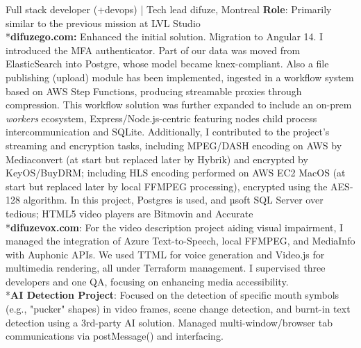 \documentclass[
  a4paper,
   maincolor=cvblue,
   sectioncolor=cvblue,
]{fortysecondscv}
\begin{document}
\newpage
\restoregeometry
{}\paperwidth

\makefrontsidebar

\vspace*{-2.9em} %
\begin{cvtable}
    {Full stack developer (+devops) | Tech lead}
    {difuze, Montreal}
    {
      \textbf{Role}: Primarily similar to the previous mission at LVL Studio\\
        \noindent\hspace*{1mm}*\textbf{difuzego.com:} Enhanced the initial solution.
        Migration to Angular 14.
        I introduced the MFA authenticator.
        Part of our data was moved from ElasticSearch into Postgre, whose model became knex-compliant.
        Also a file publishing (upload) module has been implemented,
        ingested in a workflow system based on AWS Step Functions,
        producing streamable proxies through compression.
        This workflow solution was further expanded to include an on-prem \textit{workers}
        ecosystem, Express/Node.js-centric featuring nodes child process intercommunication and SQLite.
        Additionally, I contributed to the project's streaming and encryption tasks,
        including MPEG/DASH encoding on AWS by Mediaconvert (at start but replaced later by Hybrik) and encrypted by KeyOS/BuyDRM;
        including HLS encoding performed on AWS EC2 MacOS (at start but replaced later by local FFMPEG processing), encrypted using the AES-128 algorithm.
        In this project, Postgres is used, and µsoft SQL Server over tedious; HTML5 video players are Bitmovin and Accurate \\
        \noindent\hspace*{1mm}*\textbf{difuzevox.com}: For the video description project aiding visual impairment, I managed the integration of Azure Text-to-Speech, local FFMPEG, and MediaInfo with Auphonic APIs. We used TTML for voice generation and Video.js for multimedia rendering, all under Terraform management. I supervised three developers and one QA, focusing on enhancing media accessibility.\\
        \noindent\hspace*{1mm}*\textbf{AI Detection Project}: Focused on the detection of specific mouth symbols (e.g., "pucker" shapes) in video frames, scene change detection, and burnt-in text detection using a 3rd-party AI solution. Managed multi-window/browser tab communications via postMessage() and interfacing.\\
}
\end{cvtable}
\end{document}
